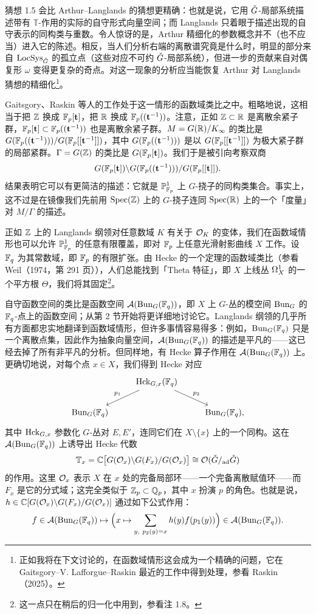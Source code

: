 猜想 1.5 会比 Arthur–Langlands 的猜想更精确：也就是说，它用 $\check{G}$-局部系统描述带有 $\mathbb{T}$-作用的实际的自守形式向量空间；而 Langlands 只着眼于描述出现的自守表示的同构类与重数。令人惊讶的是，Arthur 精细化的参数概念并不（也不应当）进入它的陈述。相反，当人们分析右端的离散谱究竟是什么时，明显的部分来自 $\operatorname{LocSys}_{\check{G}}$ 的孤立点（这些对应不可约 $\check{G}$-局部系统），但进一步的贡献来自对偶复形 $\omega$ 变得更复杂的奇点。对这一现象的分析应当能恢复 Arthur 对 Langlands 猜想的精细化\footnote{正如我将在下文讨论的，在函数域情形这会成为一个精确的问题，它在 Gaitsgory–V. Lafforgue–Raskin 最近的工作中得到处理，参看 Raskin（2025）。}。

Gaitsgory、Raskin 等人的工作处于这一情形的函数域类比之中。粗略地说，这相当于把 $\mathbb{Z}$ 换成 $\mathbb{F}_{p}[\mathbf{t}]$，把 $\mathbb{R}$ 换成 $\mathbb{F}_{p}((\mathbf{t}^{-1}))$。注意，正如 $\mathbb{Z}\subset\mathbb{R}$ 是离散余紧子群，$\mathbb{F}_{p}[\mathbf{t}]\subset\mathbb{F}_{p}((\mathbf{t}^{-1}))$ 也是离散余紧子群。$M=G(\mathbb{R})/K_\infty$ 的类比是 $G(\mathbb{F}_{p}((\mathbf{t}^{-1})))/G(\mathbb{F}_{p}[[\mathbf{t}^{-1}]])$，其中 $G(\mathbb{F}_{p}((\mathbf{t}^{-1})))$ 是以 $G(\mathbb{F}_{p}[[\mathbf{t}^{-1}]])$ 为极大紧子群的局部紧群。$\Gamma=G(\mathbb{Z})$ 的类比是 $G(\mathbb{F}_{p}[\mathbf{t}])$。我们于是被引向考察双商
\[ G(\mathbb{F}_{p}[\mathbf{t}])\backslash G(\mathbb{F}_{p}((\mathbf{t}^{-1})))/G(\mathbb{F}_{p}[[\mathbf{t}]]). \]
结果表明它可以有更简洁的描述：它就是 $\mathbb{P}^1_{\mathbb{F}_{p}}$ 上 $G$-挠子的同构类集合。事实上，这不过是在镜像我们先前用 $\operatorname{Spec}(\mathbb{Z})$ 上的 $G$-挠子连同 $\operatorname{Spec}(\mathbb{R})$ 上的一个「度量」对 $M/\Gamma$ 的描述。

正如 $\mathbb{Z}$ 上的 Langlands 纲领对任意数域 $K$ 有关于 $\mathcal{O}_K$ 的变体，我们在函数域情形也可以允许 $\mathbb{P}^1_{\mathbb{F}_{p}}$ 的任意有限覆盖，即对 $\mathbb{F}_{p}$ 上任意光滑射影曲线 $X$ 工作。设 $\mathbb{F}_{q}$ 为其常数域，即 $\mathbb{F}_{p}$ 的有限扩张。由 Hecke 的一个定理的函数域类比（参看 Weil（1974，第 291 页）），人们总能找到「Theta 特征」，即 $X$ 上线丛 $\Omega^{1}_{X}$ 的一个平方根 $\Theta$，我们将其固定\footnote{这一点只在稍后的归一化中用到，参看注 1.8。}。

自守函数空间的类比是函数空间 $\mathcal{A}(\operatorname{Bun}_G(\mathbb{F}_{q}))$，即 $X$ 上 $G$-丛的模空间 $\operatorname{Bun}_G$ 的 $\mathbb{F}_{q}$-点上的函数空间；从第 2 节开始将更详细地讨论它。Langlands 纲领的几乎所有方面都忠实地翻译到函数域情形，但许多事情容易得多：例如，$\operatorname{Bun}_G(\mathbb{F}_{q})$ 只是一个离散点集，因此作为抽象向量空间，$\mathcal{A}(\operatorname{Bun}_G(\mathbb{F}_{q}))$ 的描述是平凡的——这已经去掉了所有非平凡的分析。但同样地，有 Hecke 算子作用在 $\mathcal{A}(\operatorname{Bun}_G(\mathbb{F}_{q}))$ 上。更确切地说，对每个点 $x\in X$，我们得到 Hecke 对应
\[ \begin{tikzcd} & \Hck_{G,x}(\Fq) \arrow[dl, "p_1"'] \arrow[dr, "p_2"] & \\ \Bun_G(\Fq) & & \Bun_G(\Fq), \end{tikzcd} \]
其中 $\operatorname{Hck}_{G,x}$ 参数化 $G$-丛对 $E,E'$，连同它们在 $X\setminus\{x\}$ 上的一个同构。这在 $\mathcal{A}(\operatorname{Bun}_G(\mathbb{F}_{q}))$ 上诱导出 Hecke 代数
\[ \mathbb{T}_x=\mathbb{C}\big[G(\mathcal{O}_x)\backslash G(F_x)/G(\mathcal{O}_x)\big]\cong\mathcal{O}(\check{G}/_{\mathrm{ad}}\check{G}) \]
的作用。这里 $\mathcal{O}_x$ 表示 $X$ 在 $x$ 处的完备局部环——一个完备离散赋值环——而 $F_x$ 是它的分式域；这完全类似于 $\mathbb{Z}_p\subset\mathbb{Q}_p$，其中 $x$ 扮演 $p$ 的角色。也就是说，$h\in\mathbb{C}[G(\mathcal{O}_x)\backslash G(F_x)/G(\mathcal{O}_x)]$ 通过如下公式作用：
\[ f\in\cA(\Bun_G(\Fq))\mapsto\Big(x\mapsto\sum_{y,\ p_2(y)=x}h(y)f(p_1(y))\Big)\in\cA(\Bun_G(\Fq)). \]

